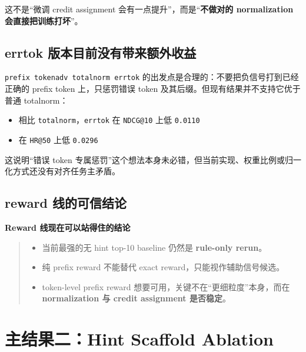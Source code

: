 \documentclass[a4paper]{article}
\newenvironment{findingbox}[1]{\par\medskip\noindent\textbf{#1}\par\begin{quote}\itshape}{\end{quote}\medskip}
\begin{document}
这不是“微调 credit assignment 会有一点提升”，而是“\textbf{不做对的 normalization 会直接把训练打坏}”。

\subsection{errtok 版本目前没有带来额外收益}

\texttt{prefix tokenadv totalnorm errtok} 的出发点是合理的：不要把负信号打到已经正确的 prefix token 上，只惩罚错误 token 及其后缀。但现有结果并不支持它优于普通 totalnorm：
\begin{itemize}
\item 相比 \texttt{totalnorm}，\texttt{errtok} 在 \texttt{NDCG@10} 上低 \texttt{0.0110}
\item 在 \texttt{HR@50} 上低 \texttt{0.0296}
\end{itemize}

这说明“错误 token 专属惩罚”这个想法本身未必错，但当前实现、权重比例或归一化方式还没有对齐任务主矛盾。

\subsection{reward 线的可信结论}

\begin{findingbox}{Reward 线现在可以站得住的结论}
\begin{itemize}
\item 当前最强的无 hint top-10 baseline 仍然是 \textbf{rule-only rerun}。
\item 纯 prefix reward 不能替代 exact reward，只能视作辅助信号候选。
\item token-level prefix reward 想要可用，关键不在“更细粒度”本身，而在 \textbf{normalization 与 credit assignment 是否稳定}。
\end{itemize}
\end{findingbox}

\section{主结果二：Hint Scaffold Ablation}
\end{document}
